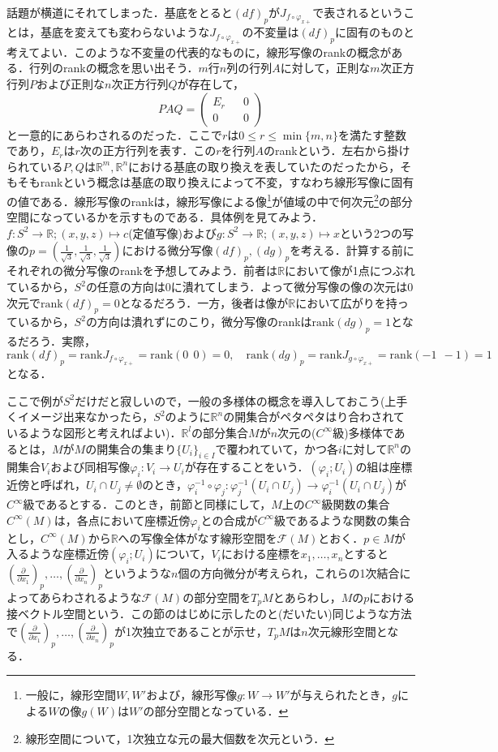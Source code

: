 \documentclass{jsarticle}
\def\vecb{\begin{pmatrix}}
\def\vece{\end{pmatrix}}
\def\realnum{{\mathbb R}}
\def\dfrac{\displaystyle\frac}
\def\rank{{\mathrm{rank}}}
\def\delxop{\left(\dfrac{\partial}{\partial x_1}\right)_p}
\def\delxnp{\left(\dfrac{\partial}{\partial x_n}\right)_p}
\begin{document}
話題が横道にそれてしまった．基底をとると$(df)_p$が$J_{f\circ\varphi_{x+}}$で表されるということは，基底を変えても変わらないような$J_{f\circ\varphi_{x+}}$の不変量は$(df)_p$に固有のものと考えてよい．このような不変量の代表的なものに，線形写像のrankの概念がある．行列のrankの概念を思い出そう．$m$行$n$列の行列$A$に対して，正則な$m$次正方行列$P$および正則な$n$次正方行列$Q$が存在して，
$$
PAQ=\vecb E_r && 0 \\ 0 && 0 \vece
$$
と一意的にあらわされるのだった．ここで$r$は$0\le r \le \min\{m,n\}$を満たす整数であり，$E_r$は$r$次の正方行列を表す．この$r$を行列$A$のrankという．左右から掛けられている$P,Q$は$\realnum^m,\realnum^n$における基底の取り換えを表していたのだったから，そもそもrankという概念は基底の取り換えによって不変，すなわち線形写像に固有の値である．線形写像のrankは，線形写像による像\footnote{一般に，線形空間$W,W'$および，線形写像$g:W\rightarrow W'$が与えられたとき，$g$による$W$の像$g(W)$は$W'$の部分空間となっている．}が値域の中で何次元\footnote{線形空間について，1次独立な元の最大個数を次元という．}の部分空間になっているかを示すものである．具体例を見てみよう．$f:S^2\rightarrow\realnum;(x,y,z)\mapsto c$(定値写像)および$g:S^2\rightarrow\realnum;(x,y,z)\mapsto x$という2つの写像の$p=(\frac{1}{\sqrt{3}},\frac{1}{\sqrt{3}},\frac{1}{\sqrt{3}})$における微分写像$(df)_p,(dg)_p$を考える．計算する前にそれぞれの微分写像のrankを予想してみよう．前者は$\realnum$において像が1点につぶれているから，$S^2$の任意の方向は0に潰れてしまう．よって微分写像の像の次元は0次元で$\rank(df)_p=0$となるだろう．一方，後者は像が$\realnum$において広がりを持っているから，$S^2$の方向は潰れずにのこり，微分写像のrankは$\rank(dg)_p=1$となるだろう．実際，
$$
\rank(df)_p=\rank J_{f\circ\varphi_{x+}}=\rank(0\:\:0)=0,\quad\rank(dg)_p=\rank J_{g\circ\varphi_{x+}}=\rank(-1\:\:-1)=1
$$
となる．


ここで例が$S^2$だけだと寂しいので，一般の多様体の概念を導入しておこう(上手くイメージ出来なかったら，$S^2$のように$\realnum^n$の開集合がペタペタはり合わされているような図形と考えればよい)．$\realnum^l$の部分集合$M$が$n$次元の($C^\infty$級)多様体であるとは，$M$が$M$の開集合の集まり$\{U_i\}_{i\in I}$で覆われていて，かつ各$i$に対して$\realnum^n$の開集合$V_i$および同相写像$\varphi_i:V_i\rightarrow U_i$が存在することをいう．$(\varphi_i;U_i)$の組は座標近傍と呼ばれ，$U_i\cap U_j\neq \emptyset$のとき，$\varphi_i^{-1}\circ\varphi_j:\varphi_j^{-1}(U_i\cap U_j)\rightarrow\varphi_i^{-1}(U_i\cap U_j)$が$C^{\infty}$級であるとする．このとき，前節と同様にして，$M$上の$C^{\infty}$級関数の集合$C^{\infty}(M)$は，各点において座標近傍$\varphi_i$との合成が$C^{\infty}$級であるような関数の集合とし，$C^{\infty}(M)$から$\realnum$への写像全体がなす線形空間を${\mathcal F}(M)$とおく．$p\in M$が入るような座標近傍$(\varphi_i;U_i)$について，$V_i$における座標を$x_1,\dots,x_n$とすると$\delxop,\dots,\delxnp$というような$n$個の方向微分が考えられ，これらの1次結合によってあらわされるような${\mathcal F}(M)$の部分空間を$T_pM$とあらわし，$M$の$p$における接ベクトル空間という．この節のはじめに示したのと(だいたい)同じような方法で$\delxop,\dots,\delxnp$が1次独立であることが示せ，$T_pM$は$n$次元線形空間となる．
\end{document}
